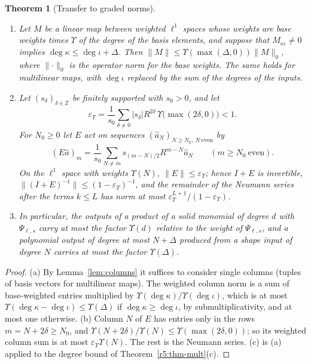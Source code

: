 \documentclass[11pt]{amsart}
\newtheorem{theorem}{Theorem}[section]
\theoremstyle{definition}
\theoremstyle{remark}
\numberwithin{equation}{section}
\newcommand{\Z}{\mathbb{Z}}
\newcommand{\eps}{\varepsilon}
\newcommand{\nrm}[1]{\lVert #1\rVert}
\begin{document}
\begin{theorem}[Transfer to graded norms]\label{r5:thm-transfer}
\begin{enumerate}[label=\textup{(\alph*)}]
\item Let $M$ be a linear map between weighted $\ell^1$ spaces whose weights are base weights times $\Upsilon$ of the degree of the basis elements, and suppose that $M_{\kappa\iota}\neq0$ implies $\deg\kappa\leq\deg\iota+\Delta$. Then $\nrm M\leq\Upsilon(\max(\Delta,0))\nrm M_0$, where $\nrm\cdot_0$ is the operator norm for the base weights. The same holds for multilinear maps, with $\deg\iota$ replaced by the sum of the degrees of the inputs.
\item Let $(s_\delta)_{\delta\in\Z}$ be finitely supported with $s_0>0$, and let
\[
\eps_\Upsilon=\frac1{s_0}\sum_{\delta\neq0}|s_\delta|R^{2\delta}\,\Upsilon\big(\max(2\delta,0)\big)<1 .
\]
For $N_0\geq0$ let $E$ act on sequences $(\hat a_N)_{N\geq N_0,\ N\ \mathrm{even}}$ by
\[
(E\hat a)_m=\frac1{s_0}\sum_{N\neq m}s_{(m-N)/2}R^{m-N}\hat a_N\qquad(m\geq N_0\ \text{even}).
\]
On the $\ell^1$ space with weights $\Upsilon(N)$, $\nrm E\leq\eps_\Upsilon$; hence $I+E$ is invertible, $\nrm{(I+E)^{-1}}\leq(1-\eps_\Upsilon)^{-1}$, and the remainder of the Neumann series after the terms $k\leq L$ has norm at most $\eps_\Upsilon^{L+1}/(1-\eps_\Upsilon)$.
\item In particular, the outputs of a product of a solid monomial of degree $d$ with $\Psi_{\ell,s}$ carry at most the factor $\Upsilon(d)$ relative to the weight of $\Psi_{\ell,s}$, and a polynomial output of degree at most $N+\Delta$ produced from a shape input of degree $N$ carries at most the factor $\Upsilon(\Delta)$.
\end{enumerate}
\end{theorem}

\begin{proof}
(a) By Lemma~\ref{lem:columns} it suffices to consider single columns (tuples of basis vectors for multilinear maps). The weighted column norm is a sum of base-weighted entries multiplied by $\Upsilon(\deg\kappa)/\Upsilon(\deg\iota)$, which is at most $\Upsilon(\deg\kappa-\deg\iota)\leq\Upsilon(\Delta)$ if $\deg\kappa\geq\deg\iota$, by submultiplicativity, and at most one otherwise. (b) Column $N$ of $E$ has entries only in the rows $m=N+2\delta\geq N_0$, and $\Upsilon(N+2\delta)/\Upsilon(N)\leq\Upsilon(\max(2\delta,0))$; so its weighted column sum is at most $\eps_\Upsilon\Upsilon(N)$. The rest is the Neumann series. (c) is (a) applied to the degree bound of Theorem~\ref{r5:thm-mult}(c).
\end{proof}
\end{document}
